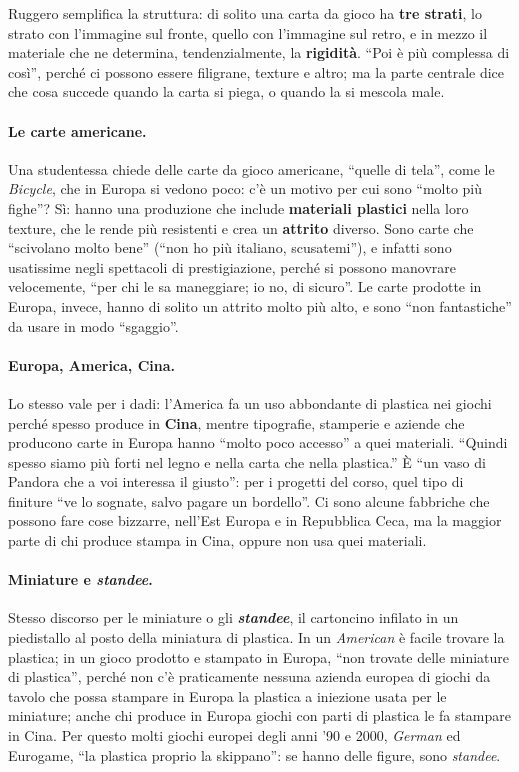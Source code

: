Ruggero semplifica la struttura: di solito una carta da gioco ha \textbf{tre strati},
lo strato con l'immagine sul fronte, quello con l'immagine sul retro, e in mezzo il
materiale che ne determina, tendenzialmente, la \textbf{rigidità}. ``Poi è più
complessa di così'', perché ci possono essere filigrane, texture e altro; ma la parte
centrale dice che cosa succede quando la carta si piega, o quando la si mescola male.

\paragraph{Le carte americane.} Una studentessa chiede delle carte da gioco americane,
``quelle di tela'', come le \emph{Bicycle}, che in Europa si vedono poco: c'è un motivo
per cui sono ``molto più fighe''? Sì: hanno una produzione che include \textbf{materiali
plastici} nella loro texture, che le rende più resistenti e crea un \textbf{attrito}
diverso. Sono carte che ``scivolano molto bene'' (``non ho più italiano, scusatemi''), e
infatti sono usatissime negli spettacoli di prestigiazione, perché si possono manovrare
velocemente, ``per chi le sa maneggiare; io no, di sicuro''. Le carte prodotte in Europa,
invece, hanno di solito un attrito molto più alto, e sono ``non fantastiche'' da usare
in modo ``sgaggio''.

\paragraph{Europa, America, Cina.} Lo stesso vale per i dadi: l'America fa un uso
abbondante di plastica nei giochi perché spesso produce in \textbf{Cina}, mentre
tipografie, stamperie e aziende che producono carte in Europa hanno ``molto poco
accesso'' a quei materiali. ``Quindi spesso siamo più forti nel legno e nella carta che
nella plastica.'' È ``un vaso di Pandora che a voi interessa il giusto'': per i progetti
del corso, quel tipo di finiture ``ve lo sognate, salvo pagare un bordello''. Ci sono
alcune fabbriche che possono fare cose bizzarre, nell'Est Europa e in Repubblica Ceca,
ma la maggior parte di chi produce stampa in Cina, oppure non usa quei materiali.

\paragraph{Miniature e \emph{standee}.} Stesso discorso per le miniature o gli
\textbf{\emph{standee}}, il cartoncino infilato in un piedistallo al posto della
miniatura di plastica. In un \emph{American} è facile trovare la plastica; in un gioco
prodotto e stampato in Europa, ``non trovate delle miniature di plastica'', perché non
c'è praticamente nessuna azienda europea di giochi da tavolo che possa stampare in
Europa la plastica a iniezione usata per le miniature; anche chi produce in Europa giochi
con parti di plastica le fa stampare in Cina. Per questo molti giochi europei degli anni
'90 e 2000, \emph{German} ed Eurogame, ``la plastica proprio la skippano'': se hanno
delle figure, sono \emph{standee}.

